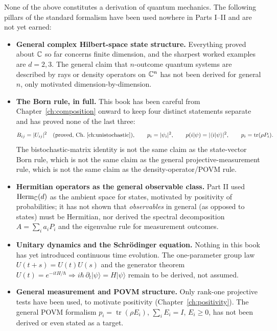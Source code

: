 None of the above constitutes a derivation of quantum mechanics. The
following pillars of the standard formalism have been used nowhere in Parts
I--II and are not yet earned:

\begin{itemize}
\item[] \textbf{General complex Hilbert-space state structure.} Everything
proved about $\mathbb{C}$ so far concerns finite dimension, and the sharpest worked
examples are $d=2,3$. The general claim that $n$-outcome quantum systems are
described by rays or density operators on $\mathbb{C}^n$ has not been derived for
general $n$, only motivated dimension-by-dimension.

\item[] \textbf{The Born rule, in full.} This book has been careful from
Chapter~\ref{ch:composition} onward to keep four distinct statements separate
and has proved none of the last three:
\begin{equation}
B_{ij} = |U_{ij}|^2 \quad(\text{proved, Ch.~\ref{ch:unistochastic}}), \qquad
p_i = |\psi_i|^2, \qquad p(i|\psi) = |\langle i|\psi\rangle|^2, \qquad p_i =
\operatorname{tr}(\rho P_i).
\end{equation}
The bistochastic-matrix identity is not the same claim as the state-vector
Born rule, which is not the same claim as the general projective-measurement
rule, which is not the same claim as the density-operator/POVM rule.

\item[] \textbf{Hermitian operators as the general observable class.} Part II
used $\mathrm{Herm}_{\mathbb{C}}(d)$ as the ambient space for states, motivated by
positivity of probabilities; it has not shown that \emph{observables} in
general (as opposed to states) must be Hermitian, nor derived the spectral
decomposition $A = \sum_i a_i P_i$ and the eigenvalue rule for measurement
outcomes.

\item[] \textbf{Unitary dynamics and the Schrödinger equation.} Nothing in
this book has yet introduced continuous time evolution. The one-parameter
group law $U(t+s)=U(t)U(s)$ and the generator theorem $U(t) = e^{-itH/\hbar}
\Rightarrow i\hbar\,\partial_t|\psi\rangle = H|\psi\rangle$ remain to be
derived, not assumed.

\item[] \textbf{General measurement and POVM structure.} Only rank-one
projective tests have been used, to motivate positivity
(Chapter~\ref{ch:positivity}). The general POVM formalism
$p_i=\operatorname{tr}(\rho E_i)$, $\sum_i E_i = I$, $E_i \ge 0$, has not been
derived or even stated as a target.
\end{itemize}

